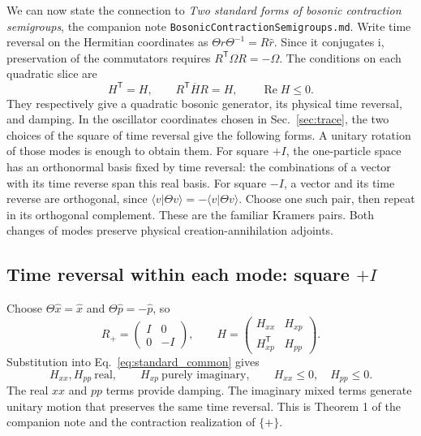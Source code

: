 \documentclass[11pt,a4paper]{article}
\newcommand{\ii}{\mathrm i}
\newcommand{\trans}{\mathsf T}
\numberwithin{equation}{section}
\begin{document}
We can now state the connection to \emph{Two standard forms of bosonic
contraction semigroups}, the companion note
\texttt{BosonicContractionSemigroups.md}.
Write time reversal on the Hermitian coordinates as
$\Theta\hat r\Theta^{-1}=R\hat r$. Since it conjugates $\ii$, preservation
of the commutators requires $R^\trans\Omega R=-\Omega$. The conditions on
each quadratic slice are
\begin{equation}
 \boxed{H^\trans=H,\qquad R^\trans\overline H R=H,
 \qquad \operatorname{Re}H\leq0.}
 \label{eq:standard_common}
\end{equation}
They respectively give a quadratic bosonic generator, its physical time
reversal, and damping. In the oscillator coordinates chosen in
Sec.~\ref{sec:trace}, the two
choices of the square of time reversal give the following forms.
A unitary rotation of those modes is enough to obtain them. For square $+I$,
the one-particle space has an orthonormal basis fixed by time reversal:
the combinations of a vector with its time reverse span this real basis.
For square $-I$, a vector and its time reverse are orthogonal, since
$\langle v|\Theta v\rangle=-\langle v|\Theta v\rangle$. Choose one such pair,
then repeat in its orthogonal complement. These are the familiar Kramers
pairs. Both changes of modes preserve physical creation-annihilation
adjoints.

\subsection{Time reversal within each mode: square \texorpdfstring{$+I$}{+I}}

Choose $\Theta\hat x=\hat x$ and $\Theta\hat p=-\hat p$, so
\begin{equation}
 R_+=\begin{pmatrix}I&0\\0&-I\end{pmatrix},\qquad
 H=\begin{pmatrix}H_{xx}&H_{xp}\\H_{xp}^\trans&H_{pp}\end{pmatrix}.
\end{equation}
Substitution into Eq.~\eqref{eq:standard_common} gives
\begin{equation}
 \boxed{H_{xx},H_{pp}\ \text{real},\qquad
 H_{xp}\ \text{purely imaginary},\qquad
 H_{xx}\leq0,\quad H_{pp}\leq0.}
 \label{eq:plus_standard}
\end{equation}
The real $xx$ and $pp$ terms provide damping. The imaginary mixed terms
generate unitary motion that preserves the same time reversal. This is
Theorem 1 of the companion note and the contraction realization of $\{+\}$.
\end{document}
